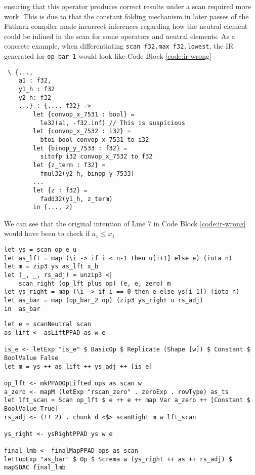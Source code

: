\documentclass{article}
\newenvironment{code}{\captionsetup{type=listing}}{}
\begin{document}
ensuring that this operator produces correct results under a scan required more work. This is due to that the constant folding mechanism in later passes of the Futhark compiler made incorrect inferences regarding how the neutral element could be inlined in the scan for some operators and neutral elements. As a concrete example, when differentiating \lstinline{scan f32.max f32.lowest}, the IR generated for \lstinline{op_bar_1} would look like Code Block \ref{code:ir-wrong}

\begin{code}
	\begin{verbatim}
 \ {...,
    a1 : f32,
    y1_h : f32
    y2_h: f32
    ...} : {..., f32} ->
        let {convop_x_7531 : bool} =
          le32(a1, -f32.inf) // This is suspicious
        let {convop_x_7532 : i32} =
          btoi bool convop_x_7531 to i32
        let {binop_y_7533 : f32} =
          sitofp i32 convop_x_7532 to f32
        let {z_term : f32} =
          fmul32(y2_h, binop_y_7533)
        ...
        let {z : f32} =
          fadd32(y1_h, z_term)
        in {..., z}
\end{verbatim}
	\caption{Incorrect IR for \lstinline{op_bar_1}}
	\label{code:ir-wrong}
\end{code}
We can see that the original intention of Line 7 in Code Block \ref{code:ir-wrong} would have been to check if $a_1 \leq x_1$
\begin{code}
	\begin{verbatim}
let ys = scan op e u
let as_lft = map (\i -> if i < n-1 then u[i+1] else e) (iota n)
let m = zip3 ys as_lft x_b
let (_, _, rs_adj) = unzip3 <|
    scan_right (op_lft plus op) (e, e, zero) m
let ys_right = map (\i -> if i == 0 then e else ys[i-1]) (iota n)
let as_bar = map (op_bar_2 op) (zip3 ys_right u rs_adj)
in  as_bar
\end{verbatim}
	\caption{Reference Futhark code for \lstinline{scan_bar} (main reverse AD fuction)}
	\label{code:fut-scanbar}
\end{code}
\begin{code}
	\begin{verbatim}
let e = scanNeutral scan
as_lift <- asLiftPPAD as w e

is_e <- letExp "is_e" $ BasicOp $ Replicate (Shape [w]) $ Constant $ BoolValue False
let m = ys ++ as_lift ++ ys_adj ++ [is_e]

op_lft <- mkPPADOpLifted ops as scan w
a_zero <- mapM (letExp "rscan_zero" . zeroExp . rowType) as_ts
let lft_scan = Scan op_lft $ e ++ e ++ map Var a_zero ++ [Constant $ BoolValue True]
rs_adj <- (!! 2) . chunk d <$> scanRight m w lft_scan

ys_right <- ysRightPPAD ys w e

final_lmb <- finalMapPPAD ops as scan
letTupExp "as_bar" $ Op $ Screma w (ys_right ++ as ++ rs_adj) $ mapSOAC final_lmb
\end{verbatim}
	\caption{Haskell code for \lstinline{scan_bar} (main reverse AD fuction)}
	\label{code:hsk-scanbar}
\end{code}
\end{document}
